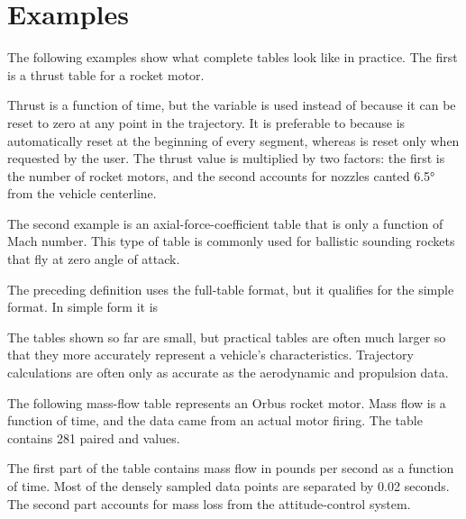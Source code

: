 \section{Examples}\label{sec:table-examples}

The following examples show what complete tables look like in practice. The first is
a thrust table for a rocket motor.



Thrust is a function of time, but the variable  is used instead of
 because it can be reset to zero at any point in the trajectory. It is
preferable to  because  is automatically reset at the
beginning of every segment, whereas  is reset only when requested
by the user. The thrust value is multiplied by two factors: the first is the number of
rocket motors, and the second accounts for nozzles canted \ang{6.5} from the vehicle
centerline.

The second example is an axial-force-coefficient table that is only a function of Mach
number. This type of table is commonly used for ballistic sounding rockets that fly
at zero angle of attack.



The preceding definition uses the full-table format, but it qualifies for the simple
format. In simple form it is



The tables shown so far are small, but practical tables are often much larger so that
they more accurately represent a vehicle's characteristics. Trajectory calculations
are often only as accurate as the aerodynamic and propulsion data.

The following mass-flow table represents an Orbus rocket motor. Mass flow is a
function of time, and the data came from an actual motor firing. The table contains
281 paired  and  values.

\clearpage


The first part of the table contains mass flow in pounds per second as a function of
time. Most of the densely sampled data points are separated by 0.02 seconds. The
second part accounts for mass loss from the attitude-control system.

